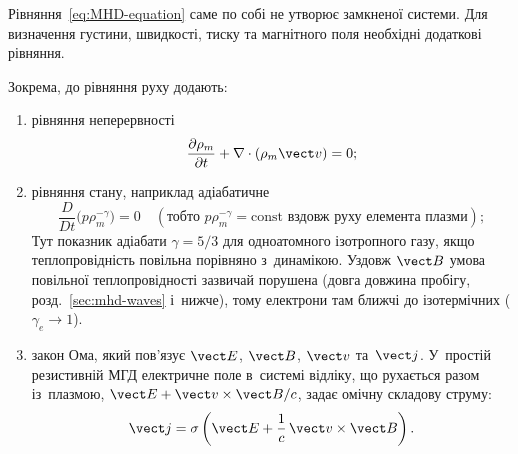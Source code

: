 Рівняння~\eqref{eq:MHD-equation} саме по собі не утворює замкненої системи. Для визначення
густини, швидкості, тиску та магнітного поля необхідні додаткові рівняння.

Зокрема, до рівняння руху додають:

\begin{enumerate}

    \item рівняння неперервності
    \begin{equation*}
        \frac{\partial\rho_m}{\partial t}
        +
        \nabla\cdot(\rho_m\vect v)
        =0;
    \end{equation*}

    \item рівняння стану, наприклад адіабатичне
    \begin{equation*}
        \frac{D}{Dt}\bigl(p\rho_m^{-\gamma}\bigr)=0
        \quad(\text{тобто }p\rho_m^{-\gamma}=\mathrm{const}\text{ вздовж руху елемента плазми});
    \end{equation*}
    Тут показник адіабати $\gamma=5/3$ для одноатомного ізотропного газу, якщо теплопровідність повільна порівняно з~динамікою.
    Уздовж $\vect B$ умова повільної теплопровідності зазвичай порушена (довга довжина пробігу, розд.~\ref{sec:mhd-waves} і~нижче), тому
    електрони там ближчі до ізотермічних ($\gamma_e\to1$).

	\item закон Ома, який пов'язує $\vect E$, $\vect B$, $\vect v$ та~$\vect j$. У~простій
	  резистивній МГД електричне поле в~системі відліку, що рухається разом із~плазмою,
	  $\vect E+\vect v\times\vect B/c$, задає омічну складову струму:
    \begin{equation}\label{eq:Ohm_law_plasma}
        \vect j=\sigma\left(\vect E+\frac{1}{c}\,\vect v\times\vect B\right).
    \end{equation}


\end{enumerate}
